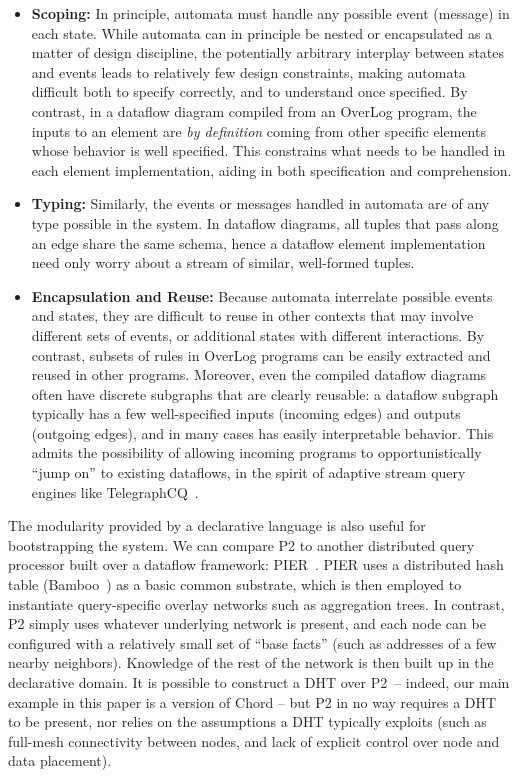 \documentclass{sig-alt-full}
\def\Sys{P2\xspace}
\def\Lang{OverLog\xspace}
\begin{document}
\begin{itemize}
\item {\bf Scoping:} In principle, automata must handle any possible
  event (message) in each state.  While automata can in principle be
  nested or encapsulated as a matter of design discipline, the
  potentially arbitrary interplay between states and events leads to
  relatively few design constraints, making automata difficult both to
  specify correctly, and to understand once specified.  By contrast, in
  a dataflow diagram compiled from an \Lang program, the inputs to an
  element are {\em by definition} coming from other
  specific elements whose behavior is well specified.  This constrains
  what needs to be handled in each element implementation,
  aiding in both specification and comprehension.
\item {\bf Typing:} Similarly, the events or messages 
  handled in automata are of any type possible in the system.  In
  dataflow diagrams, all tuples that pass along an edge share the same
  schema, hence a dataflow element implementation
  need only worry about a stream of similar, well-formed tuples.
\item {\bf Encapsulation and Reuse:} Because automata interrelate
  possible events and states, they are difficult to reuse in other
  contexts that may involve different sets of events, or additional
  states with different interactions.  By contrast, subsets of rules
  in \Lang programs can be easily extracted and reused in other
  programs.  Moreover, even the compiled dataflow
  diagrams often have discrete subgraphs that are clearly reusable: a
  dataflow subgraph typically has a few well-specified inputs
  (incoming edges) and outputs (outgoing edges), and in many cases has
  easily interpretable behavior.  This admits the possibility
  of allowing incoming programs to
  opportunistically ``jump on'' to existing dataflows, in the spirit of
  adaptive stream query engines like TelegraphCQ~\cite{telegraphcq}.
\end{itemize}

The modularity provided by a declarative language is also useful
for bootstrapping the system.   We can compare \Sys to another
distributed query processor built over a dataflow framework:
PIER~\cite{pier-cidr}.  PIER uses a distributed hash table
(Bamboo~\cite{rhea_usenix_2004}) as a basic common substrate, which is
then employed to instantiate query-specific overlay networks such as 
aggregation trees.  
In contrast, \Sys simply uses whatever underlying
network is present, and each node can be configured with a relatively
small set of ``base facts'' (such as addresses of a few nearby
neighbors).  Knowledge of the rest of the network is then built up in
the declarative domain.  It is possible to construct a DHT over \Sys~--
indeed, our main example in this paper is a version of Chord -- but \Sys
in no way requires a DHT to be present, nor relies on the assumptions
a DHT typically exploits (such as full-mesh connectivity between
nodes, and lack of explicit control over node and data placement).  
\end{document}
